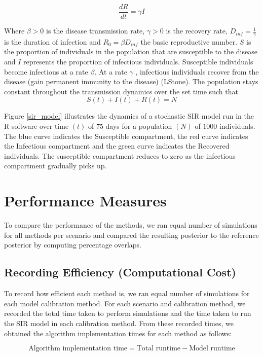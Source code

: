 \begin{equation}
\frac{dR}{dt} = \gamma I
\end{equation}


Where $\beta >0$ is the disease transmission rate, $\gamma >0$ is the recovery rate, $D_{inf} = \frac{1}{\gamma}$   is the duration of infection and $R_0 = \beta D_{inf}$ the basic reproductive number. $S$ is the proportion of individuals in the population that are susceptible to the disease and $I$ represents the proportion of infectious individuals. Susceptible individuals become infectious at a rate $\beta$. At a rate $\gamma$ , infectious individuals recover from the disease (gain permanent immunity to the disease) (LStone). 
The population stays constant throughout the transmission dynamics over the set time such that 
\begin{equation}
	S(t) + I(t) + R(t) = N
\end{equation}


Figure \ref{sir_model} illustrates the dynamics of a stochastic SIR model run in the R software over time $(t)$ of $75$ days for a population $(N)$ of $1000$ individuals. The blue curve indicates the Susceptible compartment, the red curve indicates the Infectious compartment and the green curve indicates the Recovered individuals. The susceptible compartment reduces to zero as the infectious compartment gradually picks up. 


\section{Performance Measures}
To compare the performance of the methods, we ran equal number of simulations for all methods per scenario and compared the resulting posterior to the reference posterior by computing percentage overlaps.

\subsection{Recording Efficiency (Computational Cost)}
To record how efficient each method is, we ran equal number of simulations for each model calibration method. For each scenario and calibration method, we recorded the total time taken to perform simulations and the time taken to run the SIR model in each calibration method. From these recorded times, we obtained the algorithm implementation times for each method as follows:

\begin{equation}
	\text{Algorithm implementation time} = \text{Total runtime} - \text{Model runtime}
\end{equation}

